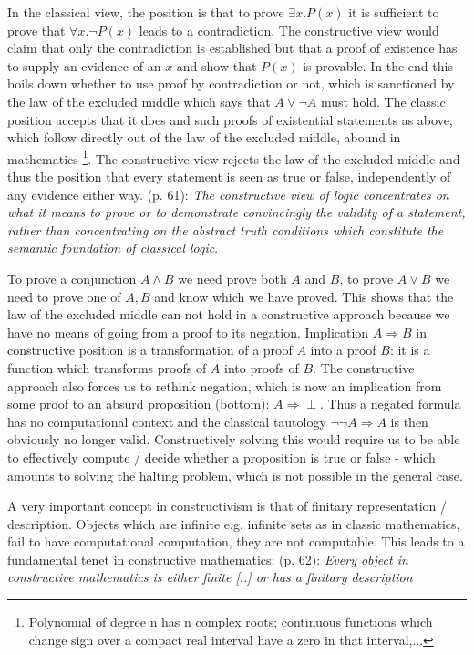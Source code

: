 In the classical view, the position is that to prove $\exists x. P(x)$ it is sufficient to prove that $\forall x. \neg P(x)$ leads to a contradiction. The constructive view would claim that only the contradiction is established but that a proof of existence has to supply an evidence of an $x$ and show that $P(x)$ is provable. In the end this boils down whether to use proof by contradiction or not, which is sanctioned by the law of the excluded middle which says that $A \lor \neg A$ must hold. The classic position accepts that it does and such proofs of existential statements as above, which follow directly out of the law of the excluded middle, abound in mathematics \footnote{Polynomial of degree n has n complex roots; continuous functions which change sign over a compact real interval have a zero in that interval,...}. The constructive view rejects the law of the excluded middle and thus the position that every statement is seen as true or false, independently of any evidence either way. \cite{thompson_type_1991} (p. 61): \textit{The constructive view of logic concentrates on what it means to prove or to demonstrate convincingly the validity of a statement, rather than concentrating on the abstract truth conditions which constitute the semantic foundation of classical logic}.

To prove a conjunction $A \land B$ we need prove both $A$ and $B$, to prove $A \lor B$ we need to prove one of $A, B$ and know which we have proved. This shows that the law of the excluded middle can not hold in a constructive approach because we have no means of going from a proof to its negation. Implication $A \Rightarrow B$ in constructive position is a transformation of a proof $A$ into a proof $B$: it is a function which transforms proofs of $A$ into proofs of $B$. The constructive approach also forces us to rethink negation, which is now an implication from some proof to an absurd proposition (bottom): $A \Rightarrow \perp$. Thus a negated formula has no computational context and the classical tautology $\neg \neg A \Rightarrow A$ is then obviously no longer valid.  Constructively solving this would require us to be able to effectively compute / decide whether a proposition is true or false - which amounts to solving the halting problem, which is not possible in the general case.

A very important concept in constructivism is that of finitary representation / description. Objects which are infinite e.g. infinite sets as in classic mathematics, fail to have computational computation, they are not computable. This leads to a fundamental tenet in constructive mathematics: \cite{thompson_type_1991} (p. 62): \textit{Every object in constructive mathematics is either finite [..] or has a finitary description}


